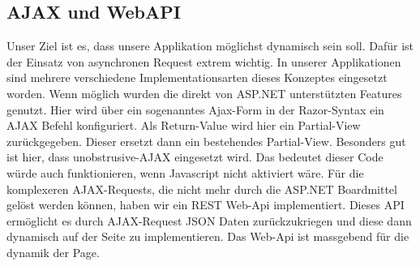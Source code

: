 	\subsection{AJAX und WebAPI}
	Unser Ziel ist es, dass unsere Applikation möglichst dynamisch sein soll. Dafür ist der Einsatz von asynchronen Request extrem wichtig. In unserer Applikationen sind mehrere verschiedene Implementationsarten dieses Konzeptes eingesetzt worden. Wenn möglich wurden die direkt von ASP.NET unterstützten Features genutzt. Hier wird über ein sogenanntes Ajax-Form in der Razor-Syntax ein AJAX Befehl konfiguriert. Als Return-Value wird hier ein Partial-View zurückgegeben. Dieser ersetzt dann ein bestehendes Partial-View.
	Besonders gut ist hier, dass unobstrusive-AJAX eingesetzt wird. Das bedeutet dieser Code würde auch funktionieren, wenn Javascript nicht aktiviert wäre.
	Für die komplexeren AJAX-Requests, die nicht mehr durch die ASP.NET Boardmittel gelöst werden können, haben wir ein REST Web-Api implementiert. Dieses API ermöglicht es durch AJAX-Request JSON Daten zurückzukriegen und diese dann dynamisch auf der Seite zu implementieren.
	Das Web-Api ist massgebend für die dynamik der Page.
